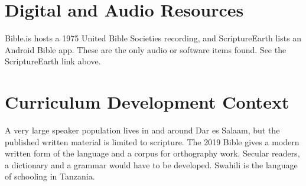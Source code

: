 \documentclass[12pt]{article}
\begin{document}
\section{Digital and Audio Resources}
Bible.is hosts a 1975 United Bible Societies recording, and ScriptureEarth lists an Android Bible app. These are the only audio or software items found. See the ScriptureEarth link above.

\section{Curriculum Development Context}
A very large speaker population lives in and around Dar es Salaam, but the published written material is limited to scripture. The 2019 Bible gives a modern written form of the language and a corpus for orthography work. Secular readers, a dictionary and a grammar would have to be developed. Swahili is the language of schooling in Tanzania.
\end{document}
